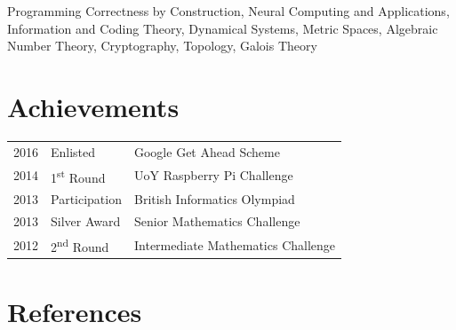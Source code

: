 \documentclass[a4paper]{cv}
\begin{document}
\begin{minipage}[t]{0.8\textwidth}
\begin{minipage}[t]{0.55\textwidth}
Programming Correctness by Construction,
Neural Computing and Applications,
Information and Coding Theory,
Dynamical Systems,
Metric Spaces,
Algebraic Number Theory,
Cryptography,
Topology,
Galois Theory

\end{minipage}

\sectionspace %


\section{Achievements} 

\begin{tabular}{rll}
2016 & Enlisted & Google Get Ahead Scheme \\
2014 & 1\textsuperscript{st} Round & UoY Raspberry Pi Challenge \\
2013 & Participation & British Informatics Olympiad \\
2013 & Silver Award & Senior Mathematics Challenge \\
2012 & 2\textsuperscript{nd} Round & Intermediate Mathematics Challenge \\
\end{tabular}

\sectionspace %





\section{References}


\end{minipage}
\end{document}
